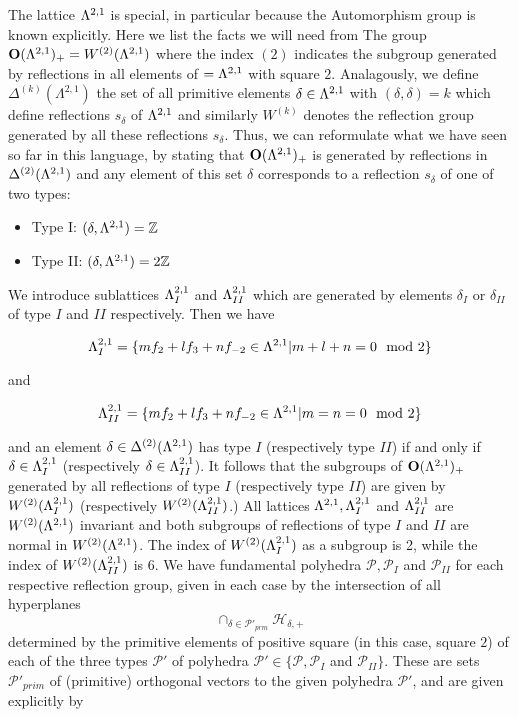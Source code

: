 \documentclass[9pt]{amsart} \usepackage[utf8]{inputenc}
\newcommand{\Z}{\mathbb{Z}} \newcommand{\C}{\mathbb{C}}
\newcommand{\Orth}{\mathbf{O}}
\newcommand{\Hpl}{\mathcal{H}}
\newcommand{\Poly}{\mathcal{P}}
\begin{document}
The lattice $\Lambda^{2,1}$ is special, in particular because the
Automorphism group is known explicitly. Here we list the facts we will
need from \cite{NIKULIN:1}
The group $\Orth(\La^{2,1})_+ = W^{(2)}(\La^{2,1})$ where the index
$(2)$ indicates the subgroup generated by reflections in all elements of
$=\Lambda^{2,1}$ with square $2$. Analagously, we define
$\Delta^{(k)}(\Lambda^{2,1})$ the set of all primitive elements
$\delta \in \Lambda^{2,1}$ with $(\delta,\delta) = k$ which define
reflections $s_{\delta}$ of $\Lambda^{2,1}$ and similarly $W^{(k)}$ denotes
the reflection group generated by all these reflections $s_{\delta}$.
Thus, we can reformulate what we have seen so far in this language, by
stating that $\Orth(\La^{2,1})_+$ is generated by reflections in
$\Delta^{(2)}(\Lambda^{2,1})$ and any element of this set $\delta$
corresponds to a reflection $s_{\delta}$ of one of two types:
\begin{itemize}
\item Type I: $(\delta, \La^{2,1}) = \Z$
\item Type II: $(\delta, \La^{2,1}) = 2\Z$
\end{itemize}

We introduce sublattices $\Lambda^{2,1}_I$ and $\Lambda^{2,1}_{II}$ which are
generated by elements $\delta_I$ or $\delta_{II}$ of type $I$ and $II$
respectively. Then we have

$$\Lambda^{2,1}_I = \{m f_2 + l f_3 + n f_{-2} \in \Lambda^{2,1} | m + l + n = 0
\mod 2\}$$

and

$$\Lambda^{2,1}_{II} = \{m f_2 + l f_3 + n f_{-2} \in \Lambda^{2,1} | m = n =  0
\mod 2\}$$

and an element $\delta \in \Delta^{(2)}(\Lambda^{2,1})$ has type $I$
(respectively type $II$) if and only if $\delta \in \Lambda^{2,1}_I$
(respectively $\delta \in \Lambda^{2,1}_{II}$). It follows that the
subgroups of $\Orth(\La^{2,1})_+$ generated by all reflections of type
$I$ (respectively type $II$) are given by $W^{(2)}(\Lambda^{2,1}_I)$
(respectively $W^{(2)}(\Lambda^{2,1}_{II})$.) All lattices $\Lambda^{2,1},
 \Lambda^{2,1}_I$ and $\Lambda^{2,1}_{II}$ are $W^{(2)}(\Lambda^{2,1})$ invariant and
 both subgroups of reflections of type $I$ and $II$ are normal in
 $W^{(2)}(\Lambda^{2,1})$. The index of $W^{(2)}(\Lambda^{2,1}_I)$ as a subgroup
 is 2, while the index of $W^{(2)}(\Lambda^{2,1}_{II})$ is $6$. We have
 fundamental polyhedra $\Poly, \Poly_I$ and $\Poly_{II}$ for each
 respective reflection group, given in each case by the intersection of
 all hyperplanes $$\cap_{\delta \in \Poly'_{prm}} \Hpl_{\delta,+}$$
 determined by the primitive elements of positive square (in this case,
 square $2$) of each of the three types  $\Poly'$ of polyhedra $\Poly'
 \in \{\Poly,
 \Poly_I$ and $\Poly_{II}\}$. These are sets $\Poly'_{prim}$ of (primitive)
 orthogonal vectors to the given polyhedra $\Poly'$, and are given explicitly by
\end{document}
